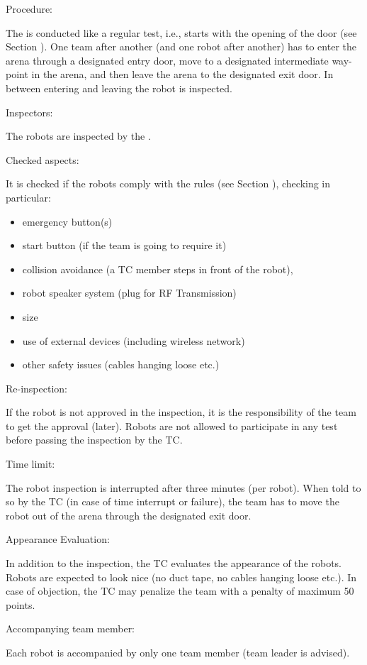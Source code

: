 \begin{enumerate}
	{\bf\item Procedure:} The  is conducted like a regular test, i.e., starts with the opening of the door (see Section ). One team after another (and one robot after another) has to enter the arena through a designated entry door, move to a designated intermediate way-point in the arena, and then leave the arena to the designated exit door. In between entering and leaving the robot is inspected.
	{\bf\item Inspectors:} The robots are inspected by the .
	{\bf\item Checked aspects:} It is checked if the robots comply with the rules (see Section ), checking in particular:
	\begin{itemize}
		\item emergency button(s)
		\item start button (if the team is going to require it)
		\item collision avoidance (a TC member steps in front of the robot),
		\item robot speaker system (plug for RF Transmission)
		\item size
		\item use of external devices (including wireless network)
		\item other safety issues (cables hanging loose etc.)
	\end{itemize}
	{\bf\item Re-inspection:} If the robot is not approved in the inspection, it is the responsibility of the team to get the approval (later). Robots are not allowed to participate in any test before passing the inspection by the TC.
	{\bf\item Time limit:} The robot inspection is interrupted after three minutes (per robot). When told to so by the TC (in case of time interrupt or failure), the team has to move the robot out of the arena through the designated exit door.
	{\bf\item Appearance Evaluation:} In addition to the inspection, the TC evaluates the appearance of the robots. Robots are expected to look nice (no duct tape, no cables hanging loose etc.). In case of objection, the TC may penalize the team with a penalty of maximum 50 points.
	{\bf\item Accompanying team member:} Each robot is accompanied by only one team member (team leader is advised).

\end{enumerate}
